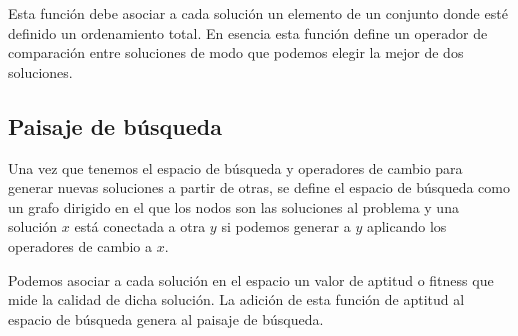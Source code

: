 Esta función debe asociar a cada solución un elemento de un conjunto donde esté definido un ordenamiento total. En esencia esta función define un operador de comparación entre soluciones de modo que podemos elegir la mejor de dos soluciones.
\subsection{Paisaje de búsqueda}
Una vez que tenemos el espacio de búsqueda y operadores de cambio para generar nuevas soluciones a partir de otras, se define el espacio de búsqueda como un grafo dirigido en el que los nodos son las soluciones al problema y una solución $x$ está conectada a otra $y$ si podemos generar a $y$ aplicando los operadores de cambio a $x$.

Podemos asociar a cada solución en el espacio un valor de aptitud o fitness que mide la calidad de dicha solución. La adición de esta función de aptitud al espacio de búsqueda genera al paisaje de búsqueda.\\

